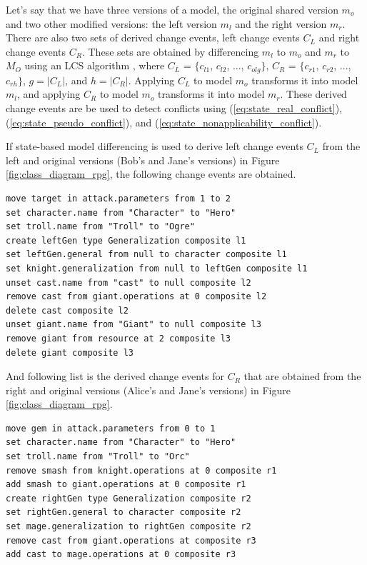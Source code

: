 Let's say that we have three versions of a model, the original shared version $m_{o}$ and two other modified versions: the left version $m_{l}$ and the right version $m_{r}$. There are also two sets of derived change events, left change events $C_{L}$ and right change events $C_{R}$. These sets are obtained by differencing $m_{l}$ to $m_{o}$ and $m_{r}$ to $M_{O}$ using an LCS algorithm \cite{emfcompare2018developer,DBLP:journals/algorithmica/Meyers86,yoh}, where $C_{L}$ = $\{c_{l1}$, $c_{l2}$, ..., $c_{olg}\}$, $C_{R}$ = $\{c_{r1}$, $c_{r2}$, ..., $c_{rh}\}$, $g = |C_{L}|$, and $h = |C_{R}|$. Applying $C_{L}$ to model $m_{o}$ transforms it into model $m_{l}$, and applying $C_{R}$ to model $m_{o}$ transforms it into model $m_{r}$. These derived change events are be used to detect conflicts using (\ref{eq:state_real_conflict}), (\ref{eq:state_pseudo_conflict}), and (\ref{eq:state_nonapplicability_conflict}).  

If state-based model differencing is used to derive left change events $C_{L}$ from the left and original versions (Bob's and Jane's versions) in Figure \ref{fig:class_diagram_rpg}, the following change events are obtained. 
\begin{lstlisting}[firstnumber=1,style=eol,caption={The derived change events made by Bob to produce the right model in Figure \ref{fig:class_diagram_left} (right version).},label=lst:cbp_left_state]
move target in attack.parameters from 1 to 2
set character.name from "Character" to "Hero"
set troll.name from "Troll" to "Ogre"
create leftGen type Generalization composite l1
set leftGen.general from null to character composite l1
set knight.generalization from null to leftGen composite l1
unset cast.name from "cast" to null composite l2
remove cast from giant.operations at 0 composite l2
delete cast composite l2
unset giant.name from "Giant" to null composite l3
remove giant from resource at 2 composite l3
delete giant composite l3
\end{lstlisting}

And following list is the derived change events for $C_{R}$ that are obtained from the right and original versions (Alice's and Jane's versions) in Figure \ref{fig:class_diagram_rpg}. 
\begin{lstlisting}[firstnumber=1,style=eol,caption={The derived change events (operations) made by Alice to produce the right model in Figure \ref{fig:class_diagram_right} (right version).},label=lst:cbp_right_state]
move gem in attack.parameters from 0 to 1
set character.name from "Character" to "Hero"
set troll.name from "Troll" to "Orc"
remove smash from knight.operations at 0 composite r1
add smash to giant.operations at 0 composite r1
create rightGen type Generalization composite r2
set rightGen.general to character composite r2
set mage.generalization to rightGen composite r2
remove cast from giant.operations at composite r3
add cast to mage.operations at 0 composite r3
\end{lstlisting}

